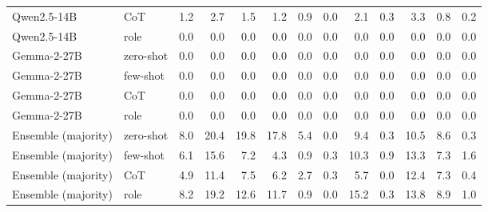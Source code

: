 \begin{tabular}{llrrrrrrrrrrr}
Qwen2.5-14B & CoT & 1.2 & 2.7 & 1.5 & 1.2 & 0.9 & 0.0 & 2.1 & 0.3 & 3.3 & 0.8 & 0.2 \\
Qwen2.5-14B & role & 0.0 & 0.0 & 0.0 & 0.0 & 0.0 & 0.0 & 0.0 & 0.0 & 0.0 & 0.0 & 0.0 \\
Gemma-2-27B & zero-shot & 0.0 & 0.0 & 0.0 & 0.0 & 0.0 & 0.0 & 0.0 & 0.0 & 0.0 & 0.0 & 0.0 \\
Gemma-2-27B & few-shot & 0.0 & 0.0 & 0.0 & 0.0 & 0.0 & 0.0 & 0.0 & 0.0 & 0.0 & 0.0 & 0.0 \\
Gemma-2-27B & CoT & 0.0 & 0.0 & 0.0 & 0.0 & 0.0 & 0.0 & 0.0 & 0.0 & 0.0 & 0.0 & 0.0 \\
Gemma-2-27B & role & 0.0 & 0.0 & 0.0 & 0.0 & 0.0 & 0.0 & 0.0 & 0.0 & 0.0 & 0.0 & 0.0 \\
Ensemble (majority) & zero-shot & 8.0 & 20.4 & 19.8 & 17.8 & 5.4 & 0.0 & 9.4 & 0.3 & 10.5 & 8.6 & 0.3 \\
Ensemble (majority) & few-shot & 6.1 & 15.6 & 7.2 & 4.3 & 0.9 & 0.3 & 10.3 & 0.9 & 13.3 & 7.3 & 1.6 \\
Ensemble (majority) & CoT & 4.9 & 11.4 & 7.5 & 6.2 & 2.7 & 0.3 & 5.7 & 0.0 & 12.4 & 7.3 & 0.4 \\
Ensemble (majority) & role & 8.2 & 19.2 & 12.6 & 11.7 & 0.9 & 0.0 & 15.2 & 0.3 & 13.8 & 8.9 & 1.0 \\
\bottomrule
\end{tabular}
